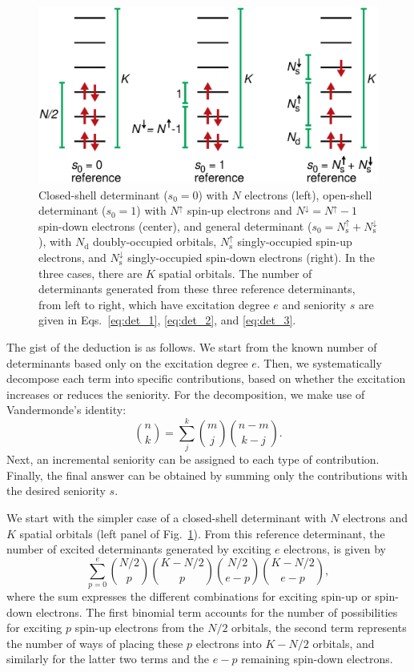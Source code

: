 \documentclass[aip,jcp,reprint,noshowkeys,superscriptaddress]{revtex4-1}
\newcommand{\Na}{N^{\uparrow}}
\newcommand{\Nb}{N^{\downarrow}}
\newcommand{\Nd}{N_\text{d}}
\newcommand{\Nas}{N_\text{s}^{\uparrow}}
\newcommand{\Nbs}{N_\text{s}^{\downarrow}}
\begin{document}
\begin{figure}[h!]
\includegraphics[width=1.0\linewidth]{determinants_appendix}
\caption{
Closed-shell determinant ($s_0=0$) with $N$ electrons (left),
open-shell determinant ($s_0=1$) with $\Na$ spin-up electrons and $\Nb=\Na-1$ spin-down electrons (center),
and general determinant ($s_0=\Nas+\Nbs$), with $\Nd$ doubly-occupied orbitals, $\Nas$ singly-occupied spin-up electrons, and $\Nbs$ singly-occupied spin-down electrons (right).
In the three cases, there are $K$ spatial orbitals.
The number of determinants generated from these three reference determinants, from left to right, which have excitation degree $e$ and seniority $s$
are given in Eqs.~\eqref{eq:det_1}, \eqref{eq:det_2}, and \eqref{eq:det_3}.
}
\label{fig:appendix}
\end{figure}

The gist of the deduction is as follows.
We start from the known number of determinants based only on the excitation degree $e$.
Then, we systematically decompose each term into specific contributions,
based on whether the excitation increases or reduces the seniority.
For the decomposition, we make use of Vandermonde's identity:
\begin{equation}
	\binom{n}{k} = \sum_{j}^{k} \binom{m}{j} \binom{n-m}{k-j}.
\end{equation}
Next, an incremental seniority can be assigned to each type of contribution.
Finally, the final answer can be obtained by summing only the contributions with the desired seniority $s$.

We start with the simpler case of a closed-shell determinant with $N$ electrons and $K$ spatial orbitals (left panel of Fig.~\ref{fig:appendix}).
From this reference determinant, the number of excited determinants generated by exciting $e$ electrons, is given by \cite{SzaboBook}
\begin{equation}
	\sum_{p=0}^{e} \binom{N/2}{p} \binom{K-N/2}{p} \binom{N/2}{e-p} \binom{K-N/2}{e-p},
\label{eq:e_closed}
\end{equation}
where the sum expresses the different combinations for exciting spin-up or spin-down electrons.
The first binomial term accounts for the number of possibilities for exciting $p$ spin-up electrons from the $N/2$ orbitals,
the second term represents the number of ways of placing these $p$ electrons into $K-N/2$ orbitals,
and similarly for the latter two terms and the $e-p$ remaining spin-down electrons.
\end{document}

